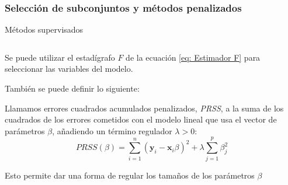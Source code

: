 \subsubsection{Selección de subconjuntos y métodos penalizados}
\begin{frame}{Métodos supervisados}
\begin{columns}
\begin{column}{0.9\textwidth}
Se puede utilizar el estadígrafo $F$ de la ecuación \ref{eq: Estimador F} para seleccionar las variables del modelo. 

También se puede definir lo siguiente: 
\begin{defi} 
Llamamos errores cuadrados acumulados penalizados, \emph{PRSS}, a la suma de los cuadrados de los errores cometidos con el modelo lineal que usa el  vector de parámetros $\beta$, añadiendo un término regulador $\lambda >0$: 
\begin{equation}
PRSS(\beta)=\sum_{i=1}^n(\textbf{y}_i-\textbf{x}_i\beta)^2+\lambda\sum_{j=1}^p\beta_j^2
\end{equation}
\end{defi}
Esto permite dar una forma de regular los tamaños de los parámetros $\beta$
\end{column}
\end{columns}
\end{frame}